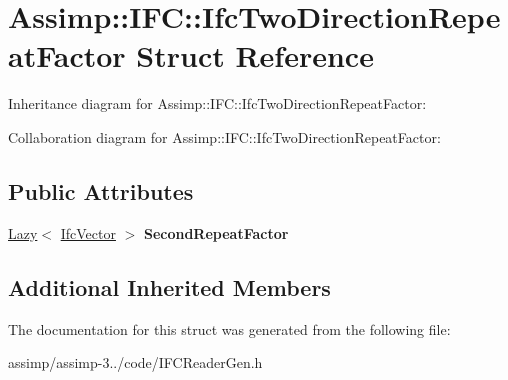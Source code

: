 \hypertarget{struct_assimp_1_1_i_f_c_1_1_ifc_two_direction_repeat_factor}{\section{Assimp\+:\+:I\+F\+C\+:\+:Ifc\+Two\+Direction\+Repeat\+Factor Struct Reference}
\label{struct_assimp_1_1_i_f_c_1_1_ifc_two_direction_repeat_factor}
}


Inheritance diagram for Assimp\+:\+:I\+F\+C\+:\+:Ifc\+Two\+Direction\+Repeat\+Factor\+:


Collaboration diagram for Assimp\+:\+:I\+F\+C\+:\+:Ifc\+Two\+Direction\+Repeat\+Factor\+:
\subsection*{Public Attributes}
\begin{DoxyCompactItemize}
\item 
\hypertarget{struct_assimp_1_1_i_f_c_1_1_ifc_two_direction_repeat_factor_a4db90047335e1cede44616640d90b30c}{\hyperlink{struct_assimp_1_1_s_t_e_p_1_1_lazy}{Lazy}$<$ \hyperlink{struct_assimp_1_1_i_f_c_1_1_ifc_vector}{Ifc\+Vector} $>$ {\bfseries Second\+Repeat\+Factor}}\label{struct_assimp_1_1_i_f_c_1_1_ifc_two_direction_repeat_factor_a4db90047335e1cede44616640d90b30c}

\end{DoxyCompactItemize}
\subsection*{Additional Inherited Members}


The documentation for this struct was generated from the following file\+:\begin{DoxyCompactItemize}
\item 
assimp/assimp-\/3../code/I\+F\+C\+Reader\+Gen.\+h\end{DoxyCompactItemize}
